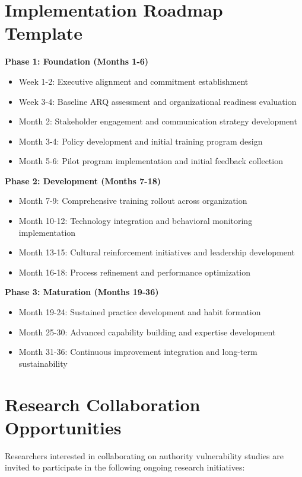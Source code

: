 \documentclass[11pt,a4paper]{article}
\begin{document}
\section{Implementation Roadmap Template}
\label{app:roadmap}

\textbf{Phase 1: Foundation (Months 1-6)}
\begin{itemize}
\item Week 1-2: Executive alignment and commitment establishment
\item Week 3-4: Baseline ARQ assessment and organizational readiness evaluation
\item Month 2: Stakeholder engagement and communication strategy development
\item Month 3-4: Policy development and initial training program design
\item Month 5-6: Pilot program implementation and initial feedback collection
\end{itemize}

\textbf{Phase 2: Development (Months 7-18)}
\begin{itemize}
\item Month 7-9: Comprehensive training rollout across organization
\item Month 10-12: Technology integration and behavioral monitoring implementation
\item Month 13-15: Cultural reinforcement initiatives and leadership development
\item Month 16-18: Process refinement and performance optimization
\end{itemize}

\textbf{Phase 3: Maturation (Months 19-36)}
\begin{itemize}
\item Month 19-24: Sustained practice development and habit formation
\item Month 25-30: Advanced capability building and expertise development
\item Month 31-36: Continuous improvement integration and long-term sustainability
\end{itemize}

\section{Research Collaboration Opportunities}
\label{app:collaboration}

Researchers interested in collaborating on authority vulnerability studies are invited to participate in the following ongoing research initiatives:
\end{document}

